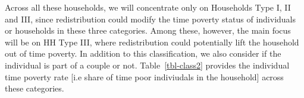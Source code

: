 \documentclass[
  11pt,
]{article}
\begin{document}
Across all these households, we will concentrate only on Households Type
I, II and III, since redistribution could modify the time poverty status
of individuals or households in these three categories. Among these,
however, the main focus will be on HH Type III, where redistribution
could potentially lift the household out of time poverty. In addition to
this classification, we also consider if the individual is part of a
couple or not. Table~\ref{tbl-class2} provides the individual time
poverty rate {[}i.e share of time poor indiviudals in the household{]}
across these categories.

\begin{table}[H]

\caption{\label{tbl-class2}Individual Classification for Redistribution
Analysis: Time Poverty Rate}


\end{table}%
\end{document}
